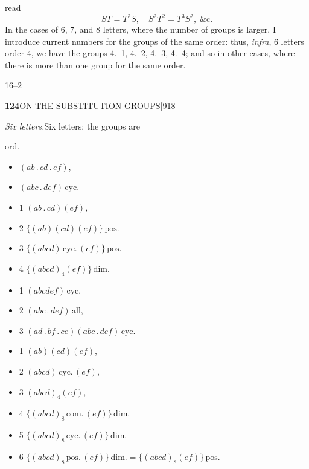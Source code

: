 \documentclass[11pt]{article}
\begin{document}
read
\[
ST=T^{2}S,\quad S^{2}T^{2}=T^{3}S^{2},\;\&\text{c.}
\]
In the cases of 6, 7, and 8 letters, where the number of groups is larger, I
introduce current numbers for the groups of the same order: thus,
\emph{infra}, 6 letters order 4, we have the groups 4.~1, 4.~2, 4.~3, 4.~4;
and so in other cases, where there is more than one group for the same
order.

\hfill 16--2

\newpage
\noindent\textbf{124}\hfill ON THE SUBSTITUTION GROUPS\hfill[918

\smallskip
\noindent\textit{Six letters.}\hspace{2em}Six letters: the groups are

\smallskip
\noindent\hspace{2em}ord.
\begin{itemize}
\setlength{\itemsep}{1pt}
\item[2.] $(ab\,.\,cd\,.\,ef)$,
\item[3.] $(abc\,.\,def)\,\text{cyc.}$
\item[4.] 1\;\; $(ab\,.\,cd)(ef)$,
\item[] \hspace{1em}2\;\; $\{(ab)(cd)(ef)\}\,\text{pos.}$
\item[] \hspace{1em}3\;\; $\{(abcd)\,\text{cyc.}\,(ef)\}\,\text{pos.}$
\item[] \hspace{1em}4\;\; $\{(abcd)_{4}(ef)\}\,\text{dim.}$
\item[6.] 1\;\; $(abcdef)\,\text{cyc.}$
\item[] \hspace{1em}2\;\; $(abc\,.\,def)\,\text{all}$,
\item[] \hspace{1em}3\;\; $(ad\,.\,bf\,.\,ce)(abc\,.\,def)\,\text{cyc.}$
\item[8.] 1\;\; $(ab)(cd)(ef)$,
\item[] \hspace{1em}2\;\; $(abcd)\,\text{cyc.}\,(ef)$,
\item[] \hspace{1em}3\;\; $(abcd)_{4}(ef)$,
\item[] \hspace{1em}4\;\; $\{(abcd)_{8}\,\text{com.}\,(ef)\}\,\text{dim.}$
\item[] \hspace{1em}5\;\; $\{(abcd)_{8}\,\text{cyc.}\,(ef)\}\,\text{dim.}$
\item[] \hspace{1em}6\;\; $\{(abcd)_{8}\,\text{pos.}\,(ef)\}\,\text{dim.}=\{(abcd)_{8}(ef)\}\,\text{pos.}$

\end{itemize}
\end{document}
